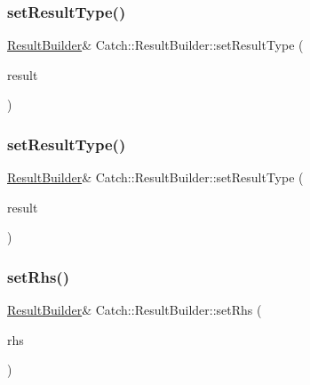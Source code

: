 \hypertarget{class_catch_1_1_result_builder_af896e372db9d7fc90ddeceff3ad110d0}{}\label{class_catch_1_1_result_builder_af896e372db9d7fc90ddeceff3ad110d0} 
\subsubsection{\texorpdfstring{set\+Result\+Type()}{setResultType()}\hspace{0.1cm}{\footnotesize\ttfamily [1/2]}}
{\footnotesize\ttfamily \hyperlink{class_catch_1_1_result_builder}{Result\+Builder}\& Catch\+::\+Result\+Builder\+::set\+Result\+Type (\begin{DoxyParamCaption}\item[{\hyperlink{struct_catch_1_1_result_was_a624e1ee3661fcf6094ceef1f654601ef}{Result\+Was\+::\+Of\+Type}}]{result }\end{DoxyParamCaption})}

\hypertarget{class_catch_1_1_result_builder_ae504348b073d0360bfd5fc33347ec689}{}\label{class_catch_1_1_result_builder_ae504348b073d0360bfd5fc33347ec689} 
\subsubsection{\texorpdfstring{set\+Result\+Type()}{setResultType()}\hspace{0.1cm}{\footnotesize\ttfamily [2/2]}}
{\footnotesize\ttfamily \hyperlink{class_catch_1_1_result_builder}{Result\+Builder}\& Catch\+::\+Result\+Builder\+::set\+Result\+Type (\begin{DoxyParamCaption}\item[{bool}]{result }\end{DoxyParamCaption})}

\hypertarget{class_catch_1_1_result_builder_aaeb41a00cf352c7a0bcf75a0ded0a4a2}{}\label{class_catch_1_1_result_builder_aaeb41a00cf352c7a0bcf75a0ded0a4a2} 
\subsubsection{\texorpdfstring{set\+Rhs()}{setRhs()}}
{\footnotesize\ttfamily \hyperlink{class_catch_1_1_result_builder}{Result\+Builder}\& Catch\+::\+Result\+Builder\+::set\+Rhs (\begin{DoxyParamCaption}\item[{std\+::string const \&}]{rhs }\end{DoxyParamCaption})}

